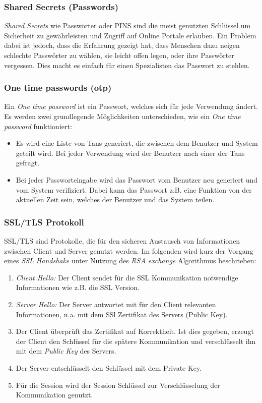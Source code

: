 \subsubsection{Shared Secrets (Passwords)}
\textit{Shared Secrets} wie Passwörter oder PINS sind die meist genutzten Schlüssel um Sicherheit zu gewährleisten und Zugriff auf Online Portale erlauben. Ein Problem dabei ist jedoch, dass die Erfahrung gezeigt hat, dass Menschen dazu neigen schlechte Passwörter zu wählen, sie leicht offen legen, oder ihre Passwörter vergessen. Dies macht es einfach für einen Spezialisten das Passwort zu stehlen. 
\subsubsection{One time passwords (otp)}
Ein \textit{One time password} ist ein Passwort, welches sich für jede Verwendung ändert. Es werden zwei grundlegende Möglichkeiten unterschieden, wie ein \textit{One time password} funktioniert:
\begin{itemize}
\item Es wird eine Liste von Tans generiert, die zwischen dem Benutzer und System geteilt wird. Bei jeder Verwendung wird der Benutzer nach einer der Tans gefragt.
\item Bei jeder Passworteingabe wird das Passwort vom Benutzer neu generiert und vom System verifiziert. Dabei kann das Passwort z.B. eine Funktion von der aktuellen Zeit sein, welches der Benutzer und das System teilen.
\end{itemize}
\subsubsection{SSL/TLS Protokoll}
SSL/TLS sind Protokolle, die für den sicheren Austausch von Informationen zwischen Client und Server genutzt werden. Im folgenden wird kurz der Vorgang eines \textit{SSL Handshake} unter Nutzung des \textit{RSA exchange} Algorithmus beschrieben:
\begin{enumerate}
\item \textit{Client Hello:} Der Client sendet für die SSL Kommunikation notwendige Informationen wie z.B. die SSL Version.
\item \textit{Server Hello:} Der Server antwortet mit für den Client relevanten Informationen, u.a. mit dem SSl Zertifikat des Servers (Public Key).
\item  Der Client überprüft das Zertifikat auf Korrektheit.  Ist dies gegeben, erzeugt der Client den Schlüssel für die spätere Kommunikation und verschlüsselt ihn mit dem \textit{Public Key} des Servers.
\item Der Server entschlüsselt den Schlüssel mit dem Private Key.
\item Für die Session wird der Session Schlüssel zur Verschlüsselung der Kommunikation genutzt.
\end{enumerate}	
